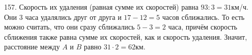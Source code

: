 157. Скорость их удаления (равная сумме их скоростей) равна $93:3=31$км/ч. Они 3 часа удалялись друг от друга и $17-12=5$ часов сближались. То есть можно считать, что они сразу сближались $5-3=2$ часа, причём скорость сближения также равна сумме их скоростей, как и скорость удаления. Значит, расстояние между  $A$ и $B$ равно $31\cdot2=62$км.\\
